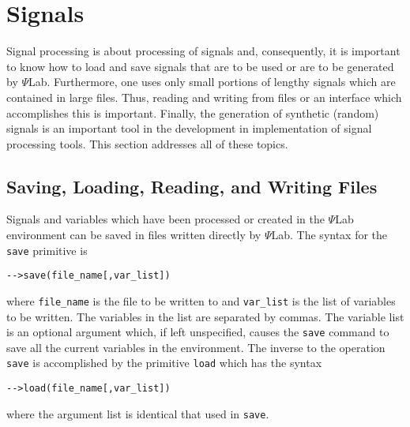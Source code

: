\section{Signals}

	Signal processing is about processing of signals and, consequently,
it is important to know how to load and save signals that are to be
used or are to be generated by $\Psi$Lab.  Furthermore, one uses only
small portions of lengthy signals which are contained 
in large files.  Thus, reading and writing from files or an interface
which accomplishes this is important.  Finally, the generation of
synthetic (random) signals is an important tool in the development
in implementation of signal processing tools.  This section addresses
all of these topics.

\subsection{Saving, Loading, Reading, and Writing Files}

	Signals and variables which have been processed or created
in the $\Psi$Lab environment can be saved in files written directly
by $\Psi$Lab.  The syntax for the {\tt save} primitive is 
\begin{verbatim}
-->save(file_name[,var_list])
\end{verbatim}
where {\tt file\_name} is the file to be written to and {\tt var\_list}
is the list of variables to be written.  The variables in the list
are separated by commas.  The variable list is an optional argument
which, if left unspecified, causes the {\tt save} command to save
all the current variables in the environment.  The inverse to the
operation {\tt save} is accomplished by the primitive {\tt load}
which has the syntax
\begin{verbatim}
-->load(file_name[,var_list])
\end{verbatim}
where the argument list is identical that used in {\tt save}.

